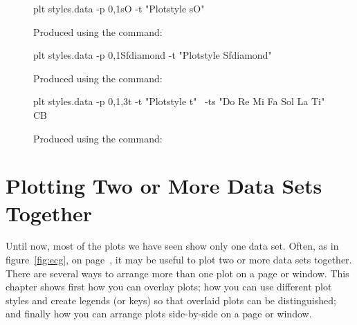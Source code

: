 \documentclass{book}
\begin{document}
\begin{figure}
\begin{center}
\end{center}
\caption[Plotstyle sO]{Produced using the command:
\label{fig:style-sO}}
\begin{center}
\begin{boxedverbatim}
plt styles.data -p 0,1sO -t "Plotstyle sO"
\end{boxedverbatim}
\end{center}
\end{figure}

\begin{figure}
\begin{center}
\end{center}
\caption[Plotstyle Sfdiamond]{Produced using the command:
\label{fig:style-Sfdiamond}}
\begin{center}
\begin{boxedverbatim}
plt styles.data -p 0,1Sfdiamond -t "Plotstyle Sfdiamond"
\end{boxedverbatim}
\end{center}
\end{figure}

\begin{figure}
\begin{center}
\end{center}
\caption[Plotstyle t]{Produced using the command:
\label{fig:style-t}}
\begin{center}
\begin{boxedverbatim}
plt styles.data -p 0,1,3t -t "Plotstyle t" \
    -ts "Do Re Mi Fa Sol La Ti" CB
\end{boxedverbatim}
\end{center}
\end{figure}


\chapter{Plotting Two or More Data Sets Together \label{sec:multiplots}}

%
Until now, most of the plots we have seen show only one data set.
Often, as in figure~\ref{fig:ecg}, on page~\pageref{fig:ecg}, it may be
useful to plot two or more data sets together.
There are several ways to arrange more than one plot on a page or
window.  This chapter shows first how you can overlay plots; how you
can use different plot styles and create legends (or keys) so that
overlaid plots can be distinguished; and finally how you can arrange
plots side-by-side on a page or window.
\end{document}
